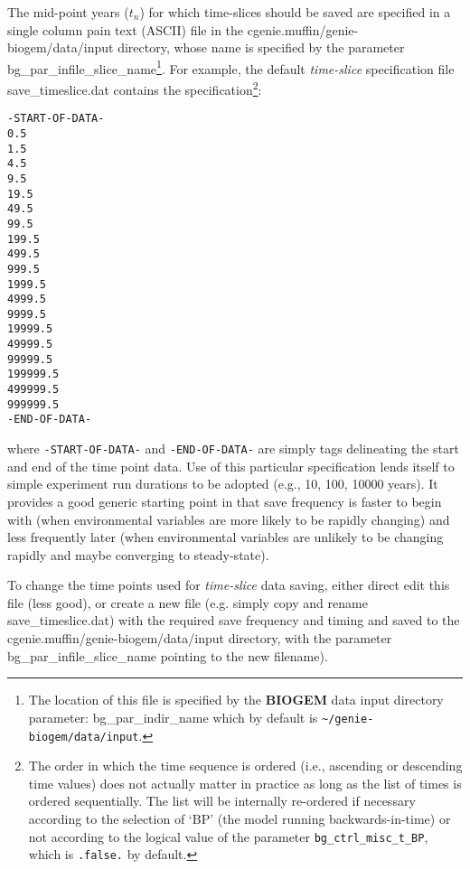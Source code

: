 \documentclass[11pt,fleqn]{book} %
\begin{document}
\vspace{1mm}The mid-point years (\begin{math}t_{n}\end{math}) for which time-slices should be saved are specified in a single column pain text (ASCII) file in the \textsf{\footnotesize cgenie.muffin/genie-biogem/data/input} directory, whose name is specified by the parameter \textsf{\footnotesize bg\_par\_infile\_slice\_name}\footnote{The location of this file is specified by the \textbf{BIOGEM} data input directory parameter: \textsf{\footnotesize bg\_par\_indir\_name} which by default is \texttt{\~{}/genie-biogem/data/input}.}.
For example, the default \textit{time-slice} specification file \textsf{\footnotesize save\_timeslice.dat} contains the specification\footnote{The order in which the time sequence is ordered (i.e., ascending or descending time values) does not actually matter in practice as long as the list of times is ordered sequentially. The list will be internally re-ordered if necessary according to the selection of ‘BP’ (the model running backwards-in-time) or not according to the logical value of the parameter \texttt{bg\_ctrl\_misc\_t\_BP}, which is \texttt{.false.} by default.}:

\footnotesize\begin{verbatim}
-START-OF-DATA-
0.5
1.5
4.5
9.5
19.5
49.5
99.5
199.5
499.5
999.5
1999.5
4999.5
9999.5
19999.5
49999.5
99999.5
199999.5
499999.5
999999.5
-END-OF-DATA-
\end{verbatim}\normalsize
where \texttt{-START-OF-DATA-} and \texttt{-END-OF-DATA-} are simply tags delineating the start and end of the time point data.
Use of this particular specification lends itself to simple experiment run durations to be adopted (e.g., 10, 100, 10000 years). It provides a good generic starting point in that save frequency is faster to begin with (when environmental variables are more likely to be rapidly changing) and less frequently later (when environmental variables are unlikely to be changing rapidly and maybe converging to steady-state).

To change the time points used for \textit{time-slice} data saving, either direct edit this file (less good), or create a new file (e.g. simply copy and rename \textsf{\footnotesize save\_timeslice.dat}) with the required save frequency and timing and saved to the \textsf{\footnotesize cgenie.muffin/genie-biogem/data/input} directory, with the parameter \textsf{\footnotesize bg\_par\_infile\_slice\_name} pointing to the new filename).
\end{document}
